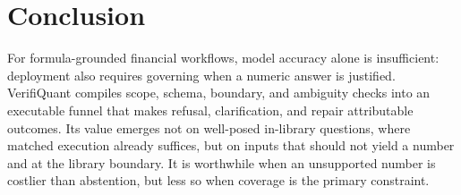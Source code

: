 \documentclass[sigconf,anonymous]{acmart}
\begin{document}

\section{Conclusion}
For formula-grounded financial workflows, model accuracy alone is insufficient: deployment also requires governing when a numeric answer is justified. VerifiQuant compiles scope, schema, boundary, and ambiguity checks into an executable funnel that makes refusal, clarification, and repair attributable outcomes. Its value emerges not on well-posed in-library questions, where matched execution already suffices, but on inputs that should not yield a number and at the library boundary. It is worthwhile when an unsupported number is costlier than abstention, but less so when coverage is the primary constraint.



\end{document}
